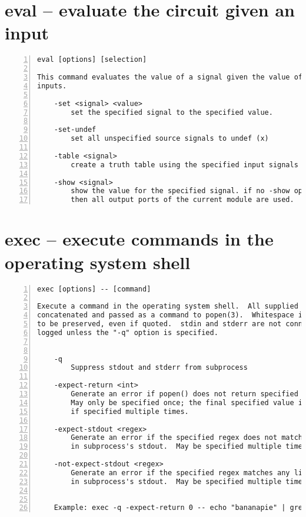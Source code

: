 \section{eval -- evaluate the circuit given an input}
\label{cmd:eval}
\begin{lstlisting}[numbers=left,frame=single]
    eval [options] [selection]

This command evaluates the value of a signal given the value of all required
inputs.

    -set <signal> <value>
        set the specified signal to the specified value.

    -set-undef
        set all unspecified source signals to undef (x)

    -table <signal>
        create a truth table using the specified input signals

    -show <signal>
        show the value for the specified signal. if no -show option is passed
        then all output ports of the current module are used.
\end{lstlisting}

\section{exec -- execute commands in the operating system shell}
\label{cmd:exec}
\begin{lstlisting}[numbers=left,frame=single]
    exec [options] -- [command]

Execute a command in the operating system shell.  All supplied arguments are
concatenated and passed as a command to popen(3).  Whitespace is not guaranteed
to be preserved, even if quoted.  stdin and stderr are not connected, while stdout is
logged unless the "-q" option is specified.


    -q
        Suppress stdout and stderr from subprocess

    -expect-return <int>
        Generate an error if popen() does not return specified value.
        May only be specified once; the final specified value is controlling
        if specified multiple times.

    -expect-stdout <regex>
        Generate an error if the specified regex does not match any line
        in subprocess's stdout.  May be specified multiple times.

    -not-expect-stdout <regex>
        Generate an error if the specified regex matches any line
        in subprocess's stdout.  May be specified multiple times.


    Example: exec -q -expect-return 0 -- echo "bananapie" | grep "nana"
\end{lstlisting}


